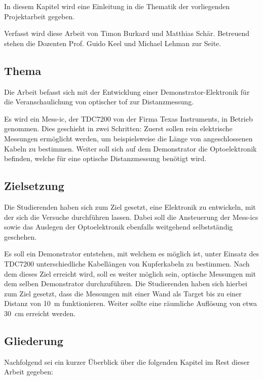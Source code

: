 In diesem Kapitel wird eine Einleitung in die Thematik der vorliegenden Projektarbeit gegeben.

Verfasst wird diese Arbeit von Timon Burkard und Matthias Schär. Betreuend stehen die Dozenten Prof. Guido Keel und
Michael Lehman zur Seite.

\subsection{Thema}
Die Arbeit befasst sich mit der Entwicklung einer Demonstrator-Elektronik für die Veranschaulichung von optischer \acrfull{tof} zur
Distanzmessung.

Es wird ein Mess-\acrshort{ic}, der TDC7200 von der Firma Texas Instruments, in Betrieb genommen. Dies geschieht in zwei
Schritten: Zuerst sollen rein elektrische Messungen ermöglicht werden, um beispielsweise die Länge von angeschlossenen
Kabeln zu bestimmen. Weiter soll sich auf dem Demonstrator die Optoelektronik befinden, welche für eine optische
Distanzmessung benötigt wird.

\subsection{Zielsetzung}
Die Studierenden haben sich zum Ziel gesetzt, eine Elektronik zu entwickeln, mit der sich die Versuche durchführen
lassen. Dabei soll die Ansteuerung der Mess-\acrshort{ic}s sowie das Auslegen der Optoelektronik ebenfalls weitgehend
selbstständig geschehen.

Es soll ein Demonstrator entstehen, mit welchem es möglich ist, unter Einsatz des TDC7200 unterschiedliche Kabellängen von
Kupferkabeln zu bestimmen. Nach dem dieses Ziel erreicht wird, soll es weiter möglich sein, optische Messungen mit dem
selben Demonstrator durchzuführen. Die Studierenden haben sich hierbei zum Ziel gesetzt, dass die Messungen mit einer Wand
als Target bis zu einer Distanz von 10~m funktionieren. Weiter sollte eine räumliche Auflösung von etwa 30~cm erreicht werden.

\subsection{Gliederung}
Nachfolgend sei ein kurzer Überblick über die folgenden Kapitel im Rest dieser Arbeit gegeben:


